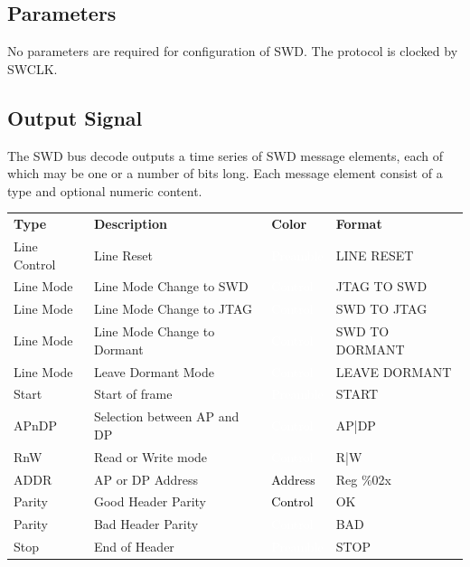 \subsection{Parameters}

No parameters are required for configuration of SWD. The protocol is clocked by SWCLK.

\subsection{Output Signal}

The SWD bus decode outputs a time series of SWD message elements, each of which may be one or a number of bits long.
Each message element consist of a type and optional numeric content.

\begin{tabularx}{16cm}{lllX}
\thickhline
\textbf{Type} & \textbf{Description} & \textbf{Color} & \textbf{Format} \\
\thickhline
Line Control & Line Reset & \cellcolor{preamble}\textcolor{white}{Preamble} & LINE RESET \\
\thinhline
Line Mode & Line Mode Change to SWD & \cellcolor{control}\textcolor{white}{Control} & JTAG TO SWD \\
\thinhline
Line Mode & Line Mode Change to JTAG & \cellcolor{control}\textcolor{white}{Control} & SWD TO JTAG \\
\thinhline
Line Mode & Line Mode Change to Dormant & \cellcolor{control}\textcolor{white}{Control} & SWD TO DORMANT \\
\thinhline
Line Mode & Leave Dormant Mode & \cellcolor{control}\textcolor{white}{Control} & LEAVE DORMANT \\
\thinhline
Start & Start of frame & \cellcolor{preamble}\textcolor{white}{Preamble} & START \\
\thinhline
APnDP & Selection between AP and DP & \cellcolor{control}\textcolor{white}{Control} & AP|DP  \\
\thinhline
RnW & Read or Write mode & \cellcolor{control}\textcolor{white}{Control} & R|W  \\
\thinhline
ADDR & AP or DP Address & \cellcolor{address}\textcolor{black}{Address} & Reg \%02x \\
\thinhline
Parity & Good Header Parity & \cellcolor{green}\textcolor{black}{Control} & OK  \\
\thinhline
Parity & Bad Header Parity & \cellcolor{red}\textcolor{white}{Control} & BAD  \\
\thinhline
Stop & End of Header & \cellcolor{preamble}\textcolor{white}{Preamble} & STOP \\

\end{tabularx}
